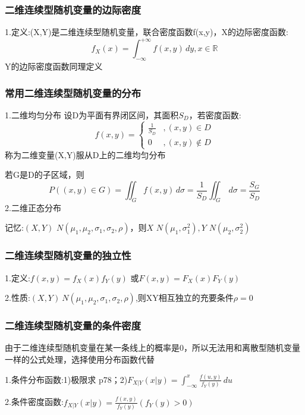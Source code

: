 \documentclass[11pt,twoside,a4paper]{ctexart}
\begin{document}
    \subsubsection{二维连续型随机变量的边际密度}
    1.定义:(X,Y)是二维连续型随机变量，联合密度函数f(x,y)，X的边际密度函数:
    \[f_X(x) = \int _{-\infty}^{+\infty}f(x,y)\,dy, x\in \mathbb{R}\]
    Y的边际密度函数同理定义

    \subsubsection{常用二维连续型随机变量的分布}
    1.二维均匀分布
    设D为平面有界闭区间，其面积$S_D$，若密度函数:
    \[f(x,y) = 
    \begin{cases}
        \frac{1}{S_D} &, (x,y)\in D \\
        0 &, (x,y)\notin D
    \end{cases}\]
    称为二维变量(X,Y)服从D上的二维均匀分布

    若G是D的子区域，则
    \[P((x,y)\in G) = \iint _G f(x,y) \, d\sigma = \frac{1}{S_D}\iint _G \,d\sigma = \frac{S_G}{S_D}\]
    2.二维正态分布

    记忆:$(X,Y)\text{~}N(\mu _1,\mu _2,\sigma _1,\sigma _2,\rho )$，则$X\text{~}N(\mu _1,\sigma _1^2),Y\text{~}N(\mu _2,\sigma _2^2)$

    \subsubsection{二维连续型随机变量的独立性}
    1.定义:$f(x,y) = f_X(x)f_Y(y)$
    或$F(x,y) = F_X(x)F_Y(y)$

    2.性质:$(X,Y)~N(\mu _1,\mu _2,\sigma _1,\sigma _2,\rho )$,则XY相互独立的充要条件$\rho = 0$
    \subsubsection{二维连续型随机变量的条件密度}
    由于二维连续型随机变量在某一条线上的概率是0，所以无法用和离散型随机变量一样的公式处理，选择使用分布函数代替

    1.条件分布函数:1)极限求 p78；2)$F_{X|Y}(x|y) = \int _{-\infty}^{x}\frac{f(u,y)}{f_Y(y)}\,du$

    2.条件密度函数:$f_{X|Y}(x|y) = \frac{f(x,y)}{f_Y(y)}  (f_Y(y) > 0)$
\end{document}
